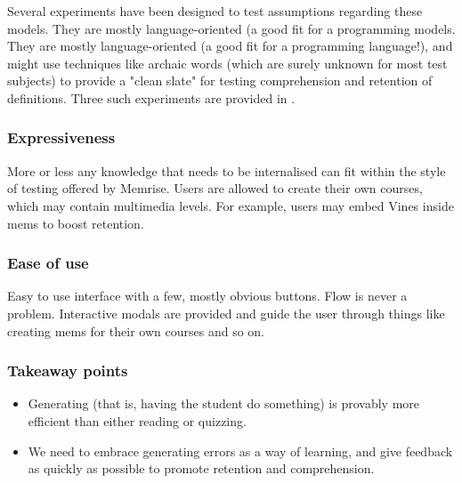 Several experiments have been designed to test assumptions regarding
these models. They are mostly language-oriented (a good fit for a programming
models. They are mostly language-oriented (a good fit for a programming
language!), and might use techniques like archaic words (which are surely
unknown for most test subjects) to provide a "clean slate" for testing
comprehension and retention of definitions. Three such experiments are provided
in \cite{potts2014benefit}.

\subsubsection{Expressiveness}

More or less any knowledge that needs to be internalised can fit within the
style of testing offered by Memrise. Users are allowed to create their own
courses, which may contain multimedia levels. For example, users may embed Vines
inside mems to boost retention. 

\subsubsection{Ease of use}

Easy to use interface with a few, mostly obvious buttons. Flow is never a 
problem. Interactive modals are provided and guide the user through things 
like creating mems for their own courses and so on.

\subsubsection{Takeaway points}

\begin{itemize}
\item Generating (that is, having the student do something) is provably more
  efficient than either reading or quizzing.
\item We need to embrace generating errors as a way of learning, and give feedback
  as quickly as possible to promote retention and comprehension.
\end{itemize}

